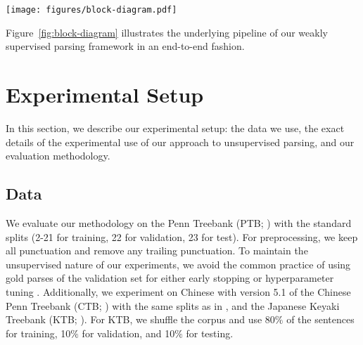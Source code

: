 \documentclass[11pt]{article}
\newcommand{\ptb}{\textsc{PTB}}
\newcommand{\ctb}{\textsc{CTB}}
\newcommand{\ktb}{\textsc{KTB}}
\begin{document}
\begin{figure*}[t]
    \centering
     \texttt{[image: figures/block-diagram.pdf]}
    \caption[Block diagram detailing our approach]{Block diagram detailing our approach. We perform the self-training procedure for five iterations which follow multiple steps; \textbf{(I)}: Fine-tune a RoBERTa\textsubscript{\textsc{Base}} model (teacher) on a downstream task using a cross-entropy loss after seed bootstrapping; \textbf{(II)}: Synthetically annotate this data using the teacher model and select top K samples corresponding to each class to form the final synthetic dataset; We fine-tune a RoBERTa\textsubscript{\textsc{Base}} model (student) on this dataset using hard labels and retrieve the outside strings from the most confident insides; \textbf{(III)}: Train the outside classifier on these outside strings;  We perform the co-training procedure for two iterations which follow a two-fold optimizing step; \textbf{(IV)}: Retrieve the inside strings from the most confident outsides and train the inside classifier; \textbf{(V)}: Retrieve the outside strings from the most confident insides and train the outside classifier.}
    \label{fig:block-diagram}
\end{figure*}


Figure~\ref{fig:block-diagram} illustrates the underlying pipeline of our weakly supervised parsing framework in an end-to-end fashion.
 \section{Experimental Setup}
\label{sec:experiments}

In this section, we describe our experimental setup: the data we use, the exact details of the experimental use of our approach to unsupervised parsing, and our evaluation methodology.

\subsection{Data}
\label{ssec:data}
We evaluate our methodology on the Penn Treebank (\ptb{}; \citealt{marcus-etal-1993-building}) with the standard splits (2-21 for training, 22 for validation, 23 for test). For preprocessing, we keep all punctuation and remove any trailing punctuation. To maintain the unsupervised nature of our experiments, we avoid the common practice of using gold parses of the validation set for either early stopping \citep{shen2018neural, shen2018ordered, drozdov-etal-2019-unsupervised} or hyperparameter tuning \citep{kim-etal-2019-compound}. Additionally, we experiment on Chinese with version 5.1 of the Chinese Penn Treebank (\ctb{}; \citealt{DBLP:journals/nle/XueXCP05}) with the same splits as in \citet{chen-manning-2014-fast}, and the Japanese Keyaki Treebank (\ktb{}; \citealt{butlerkeyaki}). For \ktb, we shuffle the corpus and use 80$\%$ of the sentences for training, 10$\%$ for validation, and 10$\%$ for testing.
\end{document}
